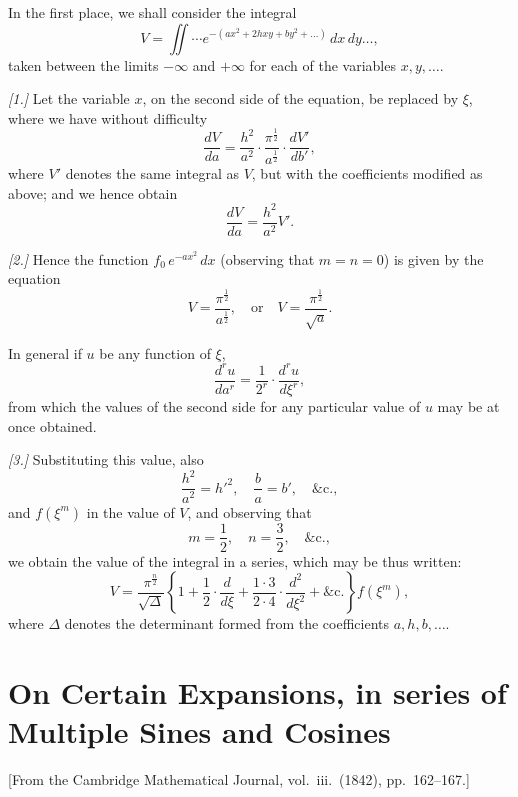 \documentclass[11pt,a4paper]{book}
\begin{document}
In the first place, we shall consider the integral
\[
V = \iint \cdots e^{-(ax^2 + 2hxy + by^2 + \ldots)}\, dx\, dy \ldots,
\]
taken between the limits $-\infty$ and $+\infty$ for each of the variables $x, y, \ldots$.

\textit{[1.]} Let the variable $x$, on the second side of the equation, be replaced by $\xi$, where we have without difficulty
\[
\frac{dV}{da} = \frac{h^2}{a^2} \cdot \frac{\pi^{\frac{1}{2}}}{a^{\frac{1}{2}}} \cdot \frac{dV'}{db'},
\]
where $V'$ denotes the same integral as $V$, but with the coefficients modified as above; and we hence obtain
\[
\frac{dV}{da} = \frac{h^2}{a^2} V'.
\]

\textit{[2.]} Hence the function $f_0\, e^{-ax^2}\, dx$ (observing that $m = n = 0$) is given by the equation
\[
V = \frac{\pi^{\frac{1}{2}}}{a^{\frac{1}{2}}}, \quad \text{or} \quad V = \frac{\pi^{\frac{1}{2}}}{\sqrt{a}}.
\]

In general if $u$ be any function of $\xi$,
\[
\frac{d^r u}{da^r} = \frac{1}{2^r} \cdot \frac{d^r u}{d\xi^r},
\]
from which the values of the second side for any particular value of $u$ may be at once obtained.

\textit{[3.]} Substituting this value, also
\[
\frac{h^2}{a^2} = h'^2, \quad \frac{b}{a} = b', \quad \&\mathrm{c.},
\]
and $f(\xi^m)$ in the value of $V$, and observing that
\[
m = \frac{1}{2}, \quad n = \frac{3}{2}, \quad \&\mathrm{c.},
\]
we obtain the value of the integral in a series, which may be thus written:
\[
V = \frac{\pi^{\frac{n}{2}}}{\sqrt{\Delta}} \left\{1 + \frac{1}{2} \cdot \frac{d}{d\xi} + \frac{1 \cdot 3}{2 \cdot 4} \cdot \frac{d^2}{d\xi^2} + \&\mathrm{c.}\right\} f(\xi^m),
\]
where $\Delta$ denotes the determinant formed from the coefficients $a, h, b, \ldots$.

\cleardoublepage

\chapter{On Certain Expansions, in series of Multiple Sines and Cosines}
\label{chap:paper4}

\begin{center}
\small[From the Cambridge Mathematical Journal, vol.~iii.\ (1842), pp.~162--167.]
\end{center}

\section*{}
\end{document}
